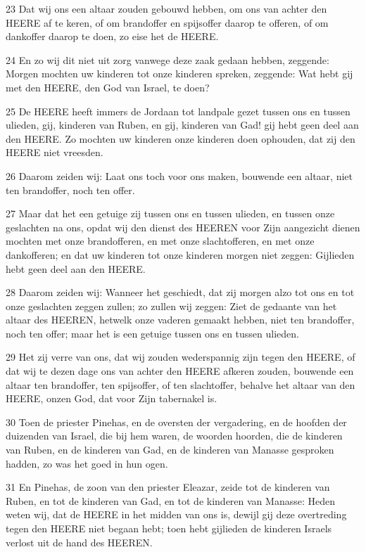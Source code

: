 \par 23 Dat wij ons een altaar zouden gebouwd hebben, om ons van achter den HEERE af te keren, of om brandoffer en spijsoffer daarop te offeren, of om dankoffer daarop te doen, zo eise het de HEERE.
\par 24 En zo wij dit niet uit zorg vanwege deze zaak gedaan hebben, zeggende: Morgen mochten uw kinderen tot onze kinderen spreken, zeggende: Wat hebt gij met den HEERE, den God van Israel, te doen?
\par 25 De HEERE heeft immers de Jordaan tot landpale gezet tussen ons en tussen ulieden, gij, kinderen van Ruben, en gij, kinderen van Gad! gij hebt geen deel aan den HEERE. Zo mochten uw kinderen onze kinderen doen ophouden, dat zij den HEERE niet vreesden.
\par 26 Daarom zeiden wij: Laat ons toch voor ons maken, bouwende een altaar, niet ten brandoffer, noch ten offer.
\par 27 Maar dat het een getuige zij tussen ons en tussen ulieden, en tussen onze geslachten na ons, opdat wij den dienst des HEEREN voor Zijn aangezicht dienen mochten met onze brandofferen, en met onze slachtofferen, en met onze dankofferen; en dat uw kinderen tot onze kinderen morgen niet zeggen: Gijlieden hebt geen deel aan den HEERE.
\par 28 Daarom zeiden wij: Wanneer het geschiedt, dat zij morgen alzo tot ons en tot onze geslachten zeggen zullen; zo zullen wij zeggen: Ziet de gedaante van het altaar des HEEREN, hetwelk onze vaderen gemaakt hebben, niet ten brandoffer, noch ten offer; maar het is een getuige tussen ons en tussen ulieden.
\par 29 Het zij verre van ons, dat wij zouden wederspannig zijn tegen den HEERE, of dat wij te dezen dage ons van achter den HEERE afkeren zouden, bouwende een altaar ten brandoffer, ten spijsoffer, of ten slachtoffer, behalve het altaar van den HEERE, onzen God, dat voor Zijn tabernakel is.
\par 30 Toen de priester Pinehas, en de oversten der vergadering, en de hoofden der duizenden van Israel, die bij hem waren, de woorden hoorden, die de kinderen van Ruben, en de kinderen van Gad, en de kinderen van Manasse gesproken hadden, zo was het goed in hun ogen.
\par 31 En Pinehas, de zoon van den priester Eleazar, zeide tot de kinderen van Ruben, en tot de kinderen van Gad, en tot de kinderen van Manasse: Heden weten wij, dat de HEERE in het midden van ons is, dewijl gij deze overtreding tegen den HEERE niet begaan hebt; toen hebt gijlieden de kinderen Israels verlost uit de hand des HEEREN.
